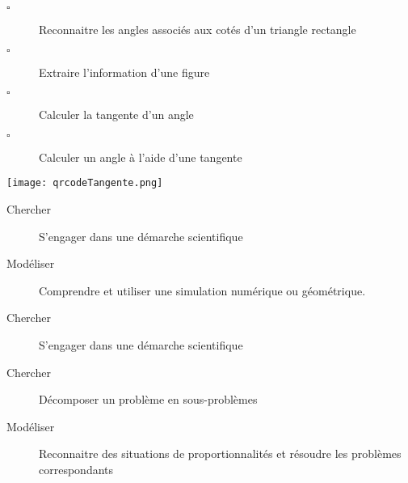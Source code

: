\documentclass[openany]{book}
\begin{document}
\begin{minipage}{0.48\linewidth}
\end{minipage}
\hfill
\begin{minipage}{0.48\linewidth}
\end{minipage}



\begin{seance}[Trigonométrie]

\begin{minipage}{0.68\linewidth}
\begin{description}
\item[$\square$] Reconnaitre les angles associés aux cotés d'un triangle rectangle
\item[$\square$] Extraire l'information d'une figure
\item[$\square$] Calculer la tangente d'un angle
\item[$\square$] Calculer un angle à l'aide d'une tangente
\end{description}

\end{minipage}
\hfill
\begin{minipage}{0.30\linewidth}
\texttt{[image: qrcodeTangente.png]} 
\end{minipage}


\end{seance}







\begin{seance}[Trigonométrie]

\begin{description}
\item[Chercher] S'engager dans une démarche scientifique
\item[Modéliser] Comprendre et utiliser une simulation numérique ou géométrique.
\end{description}
\end{seance}


\begin{seance}[Trigonométrie]

\begin{description}
\item[Chercher] S'engager dans une démarche scientifique
\item[Chercher] Décomposer un problème en sous-problèmes
\item[Modéliser] Reconnaitre des situations de proportionnalités et résoudre les problèmes correspondants
\end{description}
\end{seance}
\end{document}
